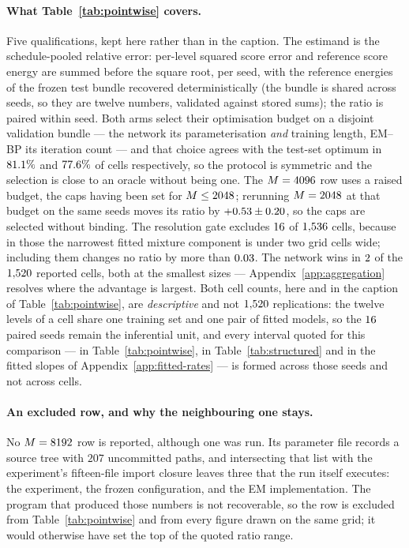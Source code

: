 \paragraph{What Table~\ref{tab:pointwise} covers.} Five qualifications, kept here rather than in
the caption. The estimand is the schedule-pooled relative error: per-level squared score error and
reference score energy are summed before the square root, per seed, with the reference energies of
the frozen test bundle recovered deterministically (the bundle is shared across seeds, so they are
twelve numbers, validated against stored sums); the ratio is paired within seed. Both arms select their optimisation budget on a disjoint validation bundle --- the
network its parameterisation \emph{and} training length, EM--BP its iteration count --- and that
choice agrees with the test-set optimum in $81.1\%$ and $77.6\%$ of cells respectively,
so the protocol is symmetric and the selection is close to an oracle without being one. The
$M=4096$ row uses a raised budget, the caps having been set for
$M\le2048$; rerunning $M=2048$ at that budget on the same seeds moves its
ratio by $+0.53\pm0.20$, so the caps are selected without binding.
The resolution gate excludes $16$ of $1{,}536$ cells, because in those the
narrowest fitted mixture component is under two grid cells wide; including them changes no ratio
by more than $0.03$. The network wins in $2$ of the $1{,}520$ reported cells,
both at the smallest sizes --- Appendix~\ref{app:aggregation} resolves where the advantage is
largest. Both cell counts, here and in the caption of Table~\ref{tab:pointwise}, are
\emph{descriptive} and not $1{,}520$ replications: the twelve levels of a cell share one
training set and one pair of fitted models, so the $16$ paired seeds remain the
inferential unit, and every interval quoted for this comparison --- in
Table~\ref{tab:pointwise}, in Table~\ref{tab:structured} and in the fitted slopes of
Appendix~\ref{app:fitted-rates} --- is formed across those seeds and not across cells.

\paragraph{An excluded row, and why the neighbouring one stays.} No $M=8192$ row is reported,
although one was run. Its parameter file records a source tree with $207$ uncommitted paths, and
intersecting that list with the experiment's fifteen-file import closure leaves three that the run
itself executes: the experiment, the frozen configuration, and the EM implementation. The program
that produced those numbers is not recoverable, so the row is excluded from
Table~\ref{tab:pointwise} and from every figure drawn on the same grid; it would otherwise have
set the top of the quoted ratio range.

